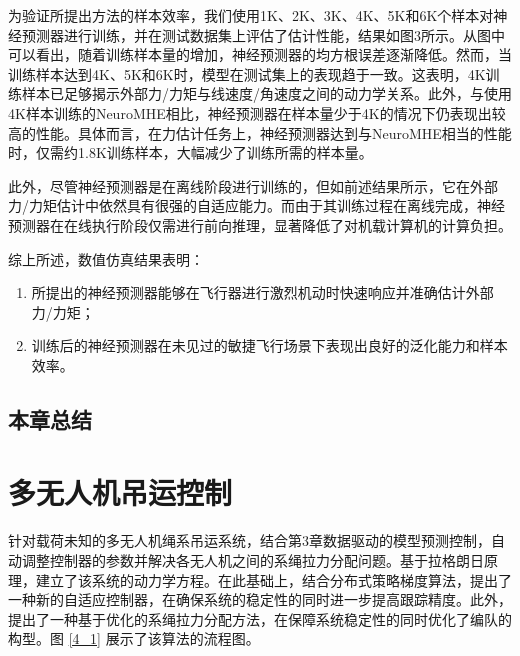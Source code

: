 \documentclass[lang=chs, degree=master, blindreview=false, winfonts=true]{yanputhesis}
\begin{document}
为验证所提出方法的样本效率，我们使用1K、2K、3K、4K、5K和6K个样本对神经预测器进行训练，并在测试数据集上评估了估计性能，结果如图3所示。从图中可以看出，随着训练样本量的增加，神经预测器的均方根误差逐渐降低。然而，当训练样本达到4K、5K和6K时，模型在测试集上的表现趋于一致。这表明，4K训练样本已足够揭示外部力/力矩与线速度/角速度之间的动力学关系。此外，与使用4K样本训练的NeuroMHE相比，神经预测器在样本量少于4K的情况下仍表现出较高的性能。具体而言，在力估计任务上，神经预测器达到与NeuroMHE相当的性能时，仅需约1.8K训练样本，大幅减少了训练所需的样本量。

此外，尽管神经预测器是在离线阶段进行训练的，但如前述结果所示，它在外部力/力矩估计中依然具有很强的自适应能力。而由于其训练过程在离线完成，神经预测器在在线执行阶段仅需进行前向推理，显著降低了对机载计算机的计算负担。

综上所述，数值仿真结果表明：
\begin{enumerate}
    \item 所提出的神经预测器能够在飞行器进行激烈机动时快速响应并准确估计外部力/力矩；
    \item 训练后的神经预测器在未见过的敏捷飞行场景下表现出良好的泛化能力和样本效率。
\end{enumerate}


\section{本章总结}




\cleardoublepage

\chapter{多无人机吊运控制}

针对载荷未知的多无人机绳系吊运系统，结合第3章数据驱动的模型预测控制，自动调整控制器的参数并解决各无人机之间的系绳拉力分配问题。基于拉格朗日原理，建立了该系统的动力学方程。在此基础上，结合分布式策略梯度算法，提出了一种新的自适应控制器，在确保系统的稳定性的同时进一步提高跟踪精度。此外，提出了一种基于优化的系绳拉力分配方法，在保障系统稳定性的同时优化了编队的构型。图 \ref{4_1} 展示了该算法的流程图。
\end{document}
